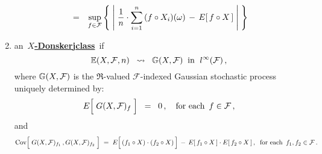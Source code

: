 \begin{definition}
\begin{enumerate}
\begin{eqnarray*}
	\\
	& = &
		\underset{f\in\mathcal{F}}{\sup}\left\{\;
			\left\vert\;
				\dfrac{1}{n}\cdot \overset{n}{\underset{i=1}{\sum}}\,(f \circ X_{i})(\omega)
				\,\overset{{\color{white}+}}{-}\,
				E[\,f \circ X\,]
			\;\right\vert
		\;\right\}
	\end{eqnarray*}
\item
	an \,\underline{\textbf{$X$-Donsker{\color{white}j}class}}\, if
	\begin{equation*}
	\mathbb{E}(X,\mathcal{F},n) \;\;\rightsquigarrow\;\; \mathbb{G}(X,\mathcal{F})
	\;\;\textnormal{in \;$l^{\infty}(\mathcal{F})$}\,,
	\end{equation*}
	where $\mathbb{G}(X,\mathcal{F})$ is the $\Re$-valued $\mathcal{F}$-indexed
	Gaussian stochastic process uniquely determined by:
	\begin{equation*}
	E\!\left[\;\overset{{\color{white}.}}{G}(X,\mathcal{F})_{f}\;\right]
	\;\; = \;\;
		0\,, \quad\textnormal{for each \,$f\in\mathcal{F}$}\,,
	\end{equation*}
	and
	\begin{equation*}
	\Cov\!\left[\;G(X,\mathcal{F})_{f_{1}}\,\overset{{\color{white}\vert}}{,}\,G(X,\mathcal{F})_{f_{2}}\;\right]
	\; = \;
		E\!\left[\,(f_{1} \circ X)\!\overset{{\color{white}-}}{\cdot}\!(f_{2} \circ X)\,\right]
		\,-\,
		E\!\left[\,f_{1} \circ X\,\right] \cdot E\!\left[\,f_{2} \circ X\,\right],
		\;\;\textnormal{for each \,$f_{1}, f_{2} \in \mathcal{F}$}\,.
	\end{equation*}
\end{enumerate}
\end{definition}


\renewcommand{\theenumi}{\roman{enumi}}
\renewcommand{\labelenumi}{\textnormal{(\theenumi)}$\;\;$}

